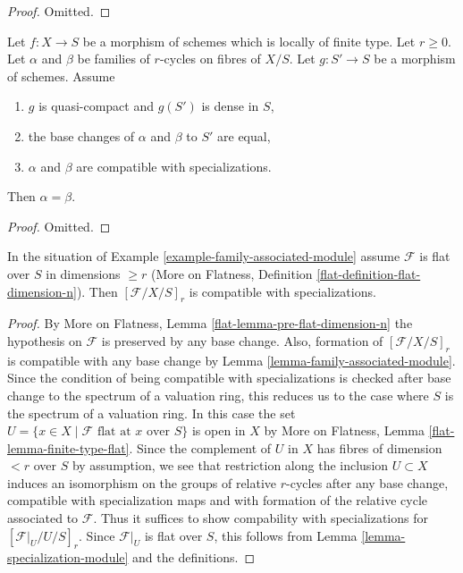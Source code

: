 \begin{proof}
Omitted.
\end{proof}

\begin{lemma}
\label{lemma-uniqueness-extension}
Let $f : X \to S$ be a morphism of schemes which is locally of finite type.
Let $r \geq 0$.
Let $\alpha$ and $\beta$ be families of $r$-cycles on fibres of $X/S$.
Let $g : S' \to S$ be a morphism of schemes. Assume
\begin{enumerate}
\item $g$ is quasi-compact and $g(S')$ is dense in $S$,
\item the base changes of $\alpha$ and $\beta$ to $S'$ are equal,
\item $\alpha$ and $\beta$ are compatible with specializations.
\end{enumerate}
Then $\alpha = \beta$.
\end{lemma}

\begin{proof}
Omitted.
\end{proof}

\begin{lemma}
\label{lemma-family-associated-module-specialization}
In the situation of Example \ref{example-family-associated-module}
assume $\mathcal{F}$ is flat over $S$ in dimensions $\geq r$
(More on Flatness, Definition \ref{flat-definition-flat-dimension-n}).
Then $[\mathcal{F}/X/S]_r$ is compatible with specializations.
\end{lemma}

\begin{proof}
By More on Flatness, Lemma \ref{flat-lemma-pre-flat-dimension-n}
the hypothesis on $\mathcal{F}$ is preserved by any base change.
Also, formation of $[\mathcal{F}/X/S]_r$ is compatible with any
base change by Lemma \ref{lemma-family-associated-module}.
Since the condition of being compatible with specializations
is checked after base change to the spectrum of a valuation ring,
this reduces us to the case where $S$ is the spectrum of a valuation ring.
In this case the set
$U = \{x \in X \mid \mathcal{F}\text{ flat at }x\text{ over }S\}$
is open in $X$ by
More on Flatness, Lemma \ref{flat-lemma-finite-type-flat}.
Since the complement of $U$ in $X$ has fibres of dimension $< r$ over
$S$ by assumption, we see that restriction along the inclusion
$U \subset X$ induces an isomorphism on the groups of relative $r$-cycles
after any base change, compatible with specialization maps and with
formation of the relative cycle associated to $\mathcal{F}$.
Thus it suffices to show compability with
specializations for $[\mathcal{F}|_U / U /S]_r$.
Since $\mathcal{F}|_U$ is flat over $S$, this follows from
Lemma \ref{lemma-specialization-module} and the definitions.
\end{proof}


